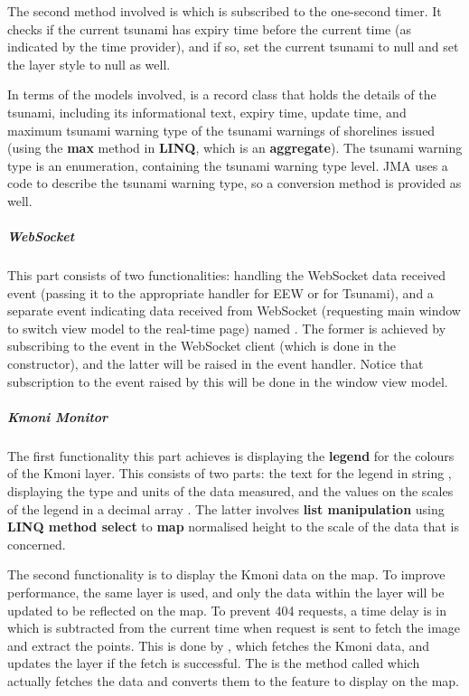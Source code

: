 The second method involved is  which is subscribed to the one-second timer. It checks if the current tsunami has expiry time before the current time (as indicated by the time provider), and if so, set the current tsunami to null and set the layer style to null as well.

In terms of the models involved,  is a record class that holds the details of the tsunami, including its informational text, expiry time, update time, and maximum tsunami warning type of the tsunami warnings of shorelines issued (using the \textbf{max} method in \textbf{LINQ}, which is an \textbf{aggregate}). The tsunami warning type is an enumeration, containing the tsunami warning type level. JMA uses a code to describe the tsunami warning type, so a conversion method is provided as well.

\subparagraph{WebSocket}

This part consists of two functionalities: handling the WebSocket data received event (passing it to the appropriate handler for EEW or for Tsunami), and a separate event indicating data received from WebSocket (requesting main window to switch view model to the real-time page) named . The former is achieved by subscribing to the event in the WebSocket client (which is done in the constructor), and the latter will be raised in the event handler. Notice that subscription to the event raised by this will be done in the window view model.

\subparagraph{Kmoni Monitor}

The first functionality this part achieves is displaying the \textbf{legend} for the colours of the Kmoni layer. This consists of two parts: the text for the legend in string , displaying the type and units of the data measured, and the values on the scales of the legend in a decimal array . The latter involves \textbf{list manipulation} using \textbf{LINQ method select} to \textbf{map} normalised height to the scale of the data that is concerned.

The second functionality is to display the Kmoni data on the map. To improve performance, the same layer  is used, and only the data within the layer will be updated to be reflected on the map. To prevent 404 requests, a time delay is in  which is subtracted from the current time when request is sent to fetch the image and extract the points. This is done by , which fetches the Kmoni data, and updates the layer if the fetch is successful. The  is the method called which actually fetches the data and converts them to the feature to display on the map.

